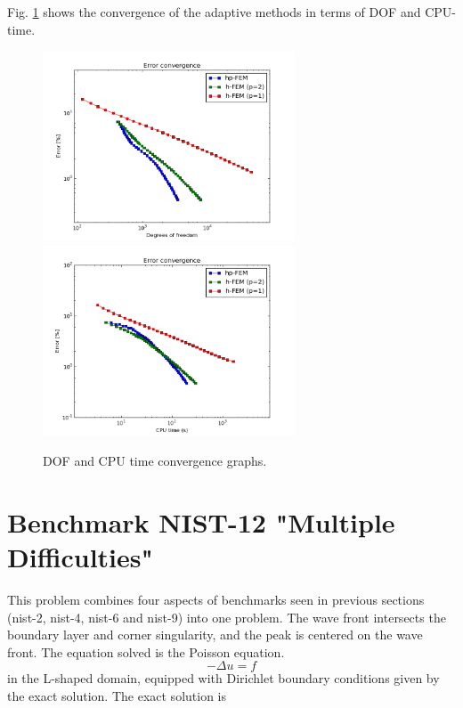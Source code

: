 \documentclass[12pt]{elsarticle}
\begin{document}
Fig. \ref{fig:nist-11-conv} shows the convergence of the adaptive methods in terms of DOF and CPU-time.

\begin{figure}[H]
\centering
\hspace{-50mm}
\includegraphics[width=7.5cm]{nist/nist-11/conv_dof_aniso.png}\ \
\hspace{-10mm}
\includegraphics[width=7.5cm]{nist/nist-11/conv_cpu_aniso.png}
\hspace{-50mm}
\caption{DOF and CPU time convergence graphs.}
\label{fig:nist-11-conv}
\end{figure}


\section{Benchmark NIST-12 "Multiple Difficulties"}
\label{sec:bench-12}

This problem combines four aspects of benchmarks
seen in previous sections (nist-2, nist-4, nist-6 and nist-9) into one problem.
The wave front intersects the boundary
layer and corner singularity, and the peak is centered on the wave front.
The equation solved is the Poisson equation.
\begin{equation} \label{multiple}
-\Delta u = f
\end{equation}
in the L-shaped domain, equipped with Dirichlet boundary conditions
given by the exact solution.
The exact solution is
\end{document}

